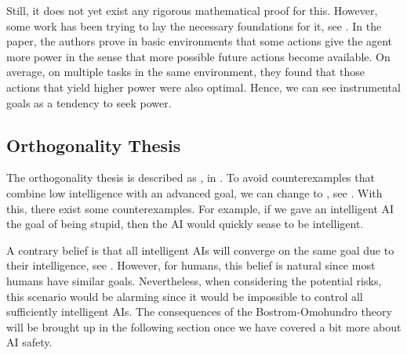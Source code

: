 \documentclass[12pt,A4]{report}
\theoremstyle{definition}
\begin{document}

Still, it does not yet exist any rigorous mathematical proof for this. However, some work has been trying to lay the necessary foundations for it, see \citet{Turner19a}. In the paper, the authors prove in basic environments that some actions give the agent more power in the sense that more possible future actions become available. On average, on multiple tasks in the same environment, they found that those actions that yield higher power were also optimal. Hence, we can see instrumental goals as a tendency to seek power.


\subsection{Orthogonality Thesis}
The orthogonality thesis is described as , in \citet{Bostrom12}. To avoid counterexamples that combine low intelligence with an advanced goal, we can change  to , see \citet{Haggstrom19}. With this, there exist some counterexamples. For example, if we gave an intelligent AI the goal of being stupid, then the AI would quickly sease to be intelligent.

A contrary belief is that all intelligent AIs will converge on the same goal due to their intelligence, see \citet{MullerCannon}. However, for humans, this belief is natural since most humans have similar goals. Nevertheless, when considering the potential risks, this scenario would be alarming since it would be impossible to control all sufficiently intelligent AIs. The consequences of the Bostrom-Omohundro theory will be brought up in the following section once we have covered a bit more about AI safety.

\end{document}
